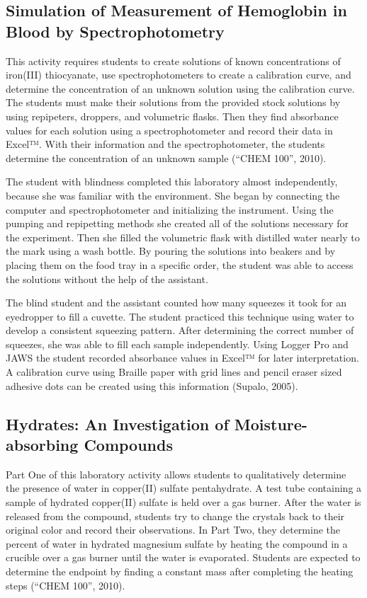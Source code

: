 \documentclass[11.5pt]{sig-alternate} %
\begin{document}
\begin{large}
\subsection*{Simulation of Measurement of Hemoglobin in Blood by Spectrophotometry}
This activity requires students to create solutions of known concentrations of iron(III) thiocyanate, use spectrophotometers to create a calibration curve, and determine the concentration of an unknown solution using the calibration curve. The students must make their solutions from the provided stock solutions by using repipeters, droppers, and volumetric flasks. Then they find absorbance values for each solution using a spectrophotometer and record their data in Excel™. With their information and the spectrophotometer, the students determine the concentration of an unknown sample (“CHEM 100”, 2010). 

The student with blindness completed this laboratory almost independently, because she was familiar with the environment. She began by connecting the computer and spectrophotometer and initializing the instrument. Using the pumping and repipetting methods she created all of the solutions necessary for the experiment. Then she filled the volumetric flask with distilled water nearly to the mark using a wash bottle. By pouring the solutions into beakers and by placing them on the food tray in a specific order, the student was able to access the solutions without the help of the assistant. 

The blind student and the assistant counted how many squeezes it took for an eyedropper to fill a cuvette. The student practiced this technique using water to develop a consistent squeezing pattern. After determining the correct number of squeezes, she was able to fill each sample independently. Using Logger Pro and JAWS the student recorded absorbance values in Excel™ for later interpretation. A calibration curve using Braille paper with grid lines and pencil eraser sized adhesive dots can be created using this information (Supalo, 2005). 

\subsection*{Hydrates: An Investigation of Moisture-absorb\-ing Compounds}

Part One of this laboratory activity allows students to qualitatively determine the presence of water in copper(II) sulfate pentahydrate. A test tube containing a sample of hydrated copper(II) sulfate is held over a gas burner. After the water is released from the compound, students try to change the crystals back to their original color and record their observations. In Part Two, they determine the percent of water in hydrated magnesium sulfate by heating the compound in a crucible over a gas burner until the water is evaporated. Students are expected to determine the endpoint by finding a constant mass after completing the heating steps (“CHEM 100”, 2010). 


\end{large}
\end{document}
